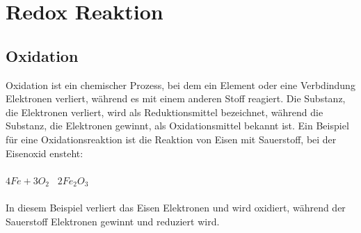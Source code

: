 
\section{Redox Reaktion}

\subsection{Oxidation} \label{sec:oxidation}
Oxidation ist ein chemischer Prozess, bei dem ein Element oder eine Verbdindung Elektronen verliert,
während es mit einem anderen Stoff reagiert. 
Die Substanz, die Elektronen verliert,
wird als Reduktionsmittel bezeichnet, während die Substanz, 
die Elektronen gewinnt, als Oxidationsmittel bekannt ist.
Ein Beispiel für eine Oxidationsreaktion ist die Reaktion von Eisen mit Sauerstoff, bei der Eisenoxid ensteht:\\ \ \\
$4Fe + 3O_2$ \textrightarrow\ $2Fe_2O_3$ \\ \ \\
In diesem Beispiel verliert das Eisen Elektronen und wird oxidiert, während der Sauerstoff Elektronen gewinnt und reduziert wird.

